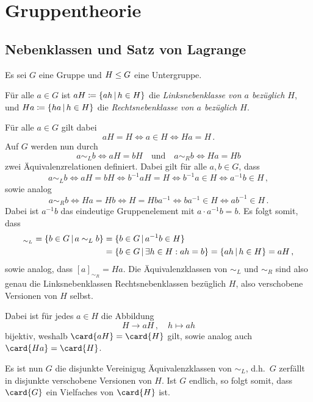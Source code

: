 \chapter{Gruppentheorie}



\section{Nebenklassen und Satz von Lagrange}

Es sei $G$ eine Gruppe und $H \mathrel{\leq} G$ eine Untergruppe.

\begin{definition}
  Für alle $a \in G$ ist $aH \defined \{ ah \suchthat h \in H \}$ die \emph{Linksnebenklasse von $a$ bezüglich $H$}, und $Ha \defined \{ ha \suchthat h \in H \}$ die \emph{Rechtsnebenklasse von $a$ bezüglich $H$}.
\end{definition}

Für alle $a \in G$ gilt dabei
\[
        aH = H
  \iff  a \in H
  \iff  Ha = H \,.
\]
Auf $G$ werden nun durch
\[
        a \sim_L b
  \iff  aH = bH
  \quad\text{und}\quad
        a \sim_R b
  \iff  Ha = Hb
\]
zwei Äquivalenzrelationen definiert.
Dabei gilt für alle $a, b \in G$, dass
\[
        a \sim_L b
  \iff  aH = bH
  \iff  b^{-1} a H = H
  \iff  b^{-1} a \in H
  \iff  a^{-1} b \in H \,,
\]
sowie analog
\[
        a \sim_R b
  \iff  Ha = Hb
  \iff  H = H b a^{-1}
  \iff  b a^{-1} \in H
  \iff  a b^{-1} \in H \,.
\]
Dabei ist $a^{-1} b$ das eindeutige Gruppenelement mit $a \cdot a^{-1} b = b$.
Es folgt somit, dass
\begin{align*}
      [a]_{\sim_L}
   =  \{ b \in G \suchthat a \sim_L b \}
  &=  \{ b \in G \suchthat a^{-1} b \in H \}  \\
  &=  \{ b \in G \suchthat \exists h \in H : ah = b \}
   =  \{ ah \suchthat h \in H \}
   =  aH \,,
\end{align*}
sowie analog, dass $[a]_{\sim_R} = Ha$.
Die Äquivalenzklassen von $\sim_L$ und $\sim_R$ sind also genau die Linksnebenklassen Rechtsnebenklassen bezüglich $H$, also verschobene Versionen von $H$ selbst.

Dabei ist für jedes $a \in H$ die Abbildung
\[
          H
  \to     aH \,,
  \quad   h
  \mapsto ah
\]
bijektiv, weshalb $\card{aH} = \card{H}$ gilt, sowie analog auch $\card{Ha} = \card{H}$.

Es ist nun $G$ die disjunkte Vereinigug Äquivalenzklassen von $\sim_L$, d.h.\ $G$ zerfällt in disjunkte verschobene Versionen von $H$.
Ist $G$ endlich, so folgt somit, dass $\card{G}$ ein Vielfaches von $\card{H}$ ist.

